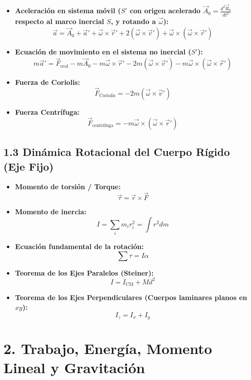 \documentclass[11pt,a4paper]{article}
\begin{document}
\begin{itemize}
  \item \textbf{Aceleración en sistema móvil ($S'$ con origen acelerado $\vec{A}_0 = \frac{d^2\vec{R}_0}{dt^2}$ respecto al marco inercial $S$, y rotando a $\vec{\omega}$):}
  \[
    \vec{a} = \vec{A}_0 + \vec{a}' + \dot{\vec{\omega}} \times \vec{r}' + 2(\vec{\omega} \times \vec{v}') + \vec{\omega} \times (\vec{\omega} \times \vec{r}')
  \]
  \item \textbf{Ecuación de movimiento en el sistema no inercial ($S'$):}
  \[
    m\vec{a}' = \vec{F}_{\text{real}} - m\vec{A}_0 - m\dot{\vec{\omega}} \times \vec{r}' - 2m(\vec{\omega} \times \vec{v}') - m\vec{\omega} \times (\vec{\omega} \times \vec{r}')
  \]
  \item \textbf{Fuerza de Coriolis:}
  \[
    \vec{F}_{\text{Coriolis}} = -2m (\vec{\omega} \times \vec{v}')
  \]
  \item \textbf{Fuerza Centrífuga:}
  \[
    \vec{F}_{\text{centrífuga}} = -m\vec{\omega} \times (\vec{\omega} \times \vec{r}')
  \]
\end{itemize}

\subsection*{1.3 Dinámica Rotacional del Cuerpo Rígido (Eje Fijo)}

\begin{itemize}
  \item \textbf{Momento de torsión / Torque:}
  \[
    \vec{\tau} = \vec{r} \times \vec{F}
  \]
  \item \textbf{Momento de inercia:}
  \[
    I = \sum_i m_i r_i^2 = \int r^2 dm
  \]
  \item \textbf{Ecuación fundamental de la rotación:}
  \[
    \sum \tau = I \alpha
  \]
  \item \textbf{Teorema de los Ejes Paralelos (Steiner):}
  \[
    I = I_{\mathrm{CM}} + M d^2
  \]
  \item \textbf{Teorema de los Ejes Perpendiculares (Cuerpos laminares planos en $xy$):}
  \[
    I_z = I_x + I_y
  \]
\end{itemize}

\section*{2. Trabajo, Energía, Momento Lineal y Gravitación}
\end{document}
